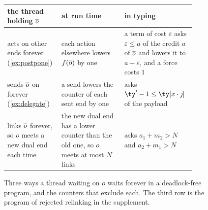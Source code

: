 \begin{figure}[tb]
  \small
  \centering
  \begin{tabular}{@{}p{0.25\linewidth}@{\quad}p{0.32\linewidth}@{\quad}p{0.33\linewidth}@{}}
    \toprule
    the thread holding $\overline{o}$ & at run time & in typing \\
    \midrule
    acts on other ends forever (\cref{ex:postpone}) &
    each action elsewhere lowers $f(\overline{o})$ by one &
    a term of cost $\varepsilon$ asks $\varepsilon \leq a$ of the credit $a$ of $\overline{o}$ and lowers it to $a - \varepsilon$, and a force costs $1$ \\[2pt]
    sends $\overline{o}$ on forever (\cref{ex:delegate}) &
    a send lowers the counter of each sent end by one &
    {E-Send} asks $\ty' - 1 \leq \payload{\ty}{x}$ of the payload \\[2pt]
    links $\overline{o}$ forever, so $o$ meets a new dual end each time &
    the new dual end has a lower counter than the old one, so $o$ meets at most $N$ links &
    {E-Link} asks $a_1 + m_2 > N$ and $a_2 + m_1 > N$ \\
    \bottomrule
  \end{tabular}
  \caption{Three ways a thread waiting on $o$ waits forever in a deadlock-free program, and the counters that exclude each. The third row is the program of rejected relinking in the supplement.}
  \label{fig:lf-failures}
\end{figure}
